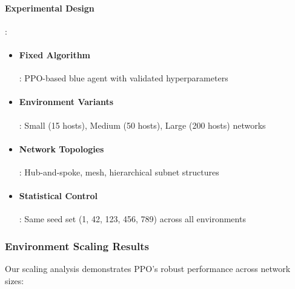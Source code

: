 \documentclass[12pt,oneside]{article}
\begin{document}
\paragraph{Experimental Design}:
\begin{itemize}
\item \paragraph{Fixed Algorithm}: PPO-based blue agent with validated hyperparameters
\item \paragraph{Environment Variants}: Small (15 hosts), Medium (50 hosts), Large (200 hosts) networks
\item \paragraph{Network Topologies}: Hub-and-spoke, mesh, hierarchical subnet structures
\item \paragraph{Statistical Control}: Same seed set (1, 42, 123, 456, 789) across all environments
\end{itemize}

\subsubsection{Environment Scaling Results}

Our scaling analysis demonstrates PPO's robust performance across network sizes:
\end{document}

